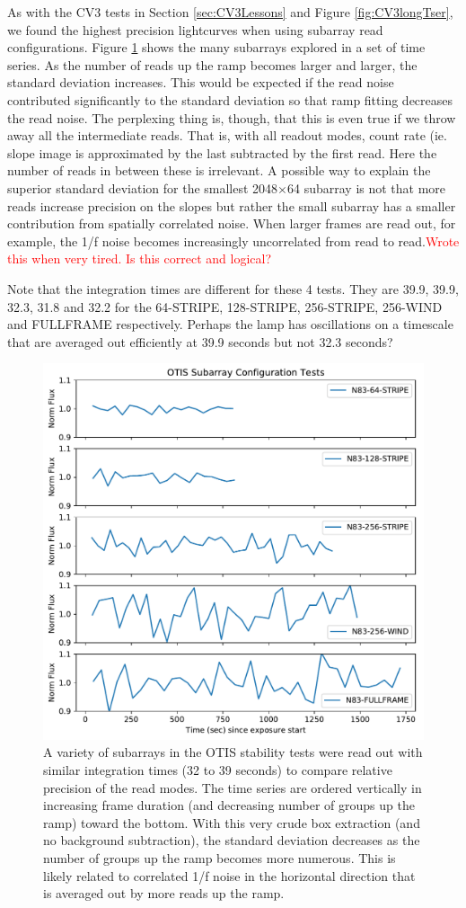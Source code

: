 \documentclass{aastex62}
\begin{document}
{As with the CV3 tests in Section \ref{sec:CV3Lessons} and Figure \ref{fig:CV3longTser}, we found the highest precision lightcurves when using subarray read configurations.
Figure \ref{fig:OTISsubarrays} shows the many subarrays explored in a set of time series.
As the number of reads up the ramp becomes larger and larger, the standard deviation increases.
This would be expected if the read noise contributed significantly to the standard deviation so that ramp fitting decreases the read noise.
The perplexing thing is, though, that this is even true if we throw away all the intermediate reads.
That is, with all readout modes, count rate (ie. slope image is approximated by the last subtracted by the first read.
Here the number of reads in between these is irrelevant.
A possible way to explain the superior standard deviation for the smallest 2048$\times$64 subarray is not that more reads increase precision on the slopes but rather the small subarray has a smaller contribution from spatially correlated noise.
When larger frames are read out, for example, the 1/f noise becomes increasingly uncorrelated from read to read.\textcolor{red}{Wrote this when very tired. Is this correct and logical?}

Note that the integration times are different for these 4 tests. They are 39.9, 39.9, 32.3, 31.8 and 32.2 for the 64-STRIPE, 128-STRIPE, 256-STRIPE, 256-WIND and FULLFRAME respectively. Perhaps the lamp has oscillations on a timescale that are averaged out efficiently at 39.9 seconds but not 32.3 seconds?

\begin{figure}[!hbtp]
\centering
\includegraphics[width=.5\columnwidth]{subarray_config_tser.pdf}
\caption{A variety of subarrays in the OTIS stability tests were read out with similar integration times (32 to 39 seconds) to compare relative precision of the read modes. 
The time series are ordered vertically in increasing frame duration (and decreasing number of groups up the ramp) toward the bottom.
With this very crude box extraction (and no background subtraction), the standard deviation decreases as the number of groups up the ramp becomes more numerous.
This is likely related to correlated 1/f noise in the horizontal direction that is averaged out by more reads up the ramp.}\label{fig:OTISsubarrays}
\end{figure}

}
\end{document}
